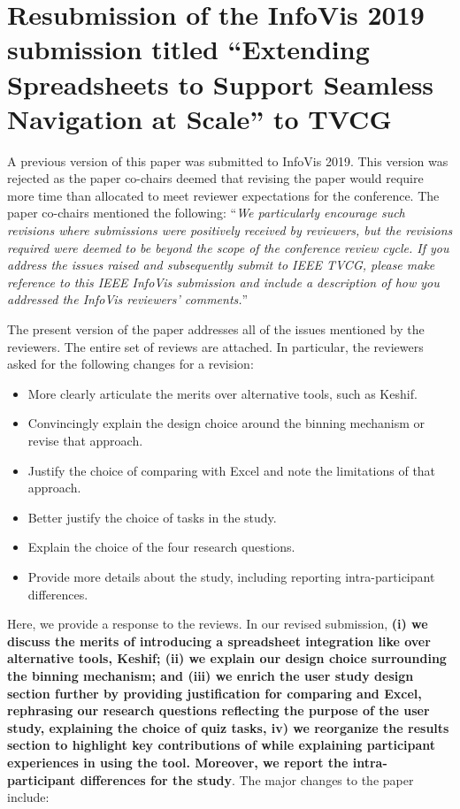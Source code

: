 \section*{Resubmission of the InfoVis 2019 submission titled ``Extending Spreadsheets to Support Seamless
Navigation at Scale'' to TVCG}

A previous version of this paper was submitted to InfoVis 2019. This version was rejected as the paper co-chairs deemed that revising the paper would require more time than allocated to meet reviewer expectations for the conference. The paper co-chairs mentioned the following: ``\textit{We particularly encourage such revisions where submissions were positively received by reviewers, but the revisions required were deemed to be beyond the scope of the conference review cycle. If you address the issues raised and subsequently submit to IEEE TVCG, please make reference to this IEEE InfoVis submission and include a description of how you addressed the InfoVis reviewers' comments.}'' 

The present version of the paper addresses all of the issues mentioned by the reviewers. The entire set of reviews are attached. In particular, the reviewers asked for the following changes for a revision: \begin{itemize}
    \item More clearly articulate the merits over alternative tools, such as Keshif. 
     \item Convincingly explain the design choice around the binning mechanism or revise
    that approach.
    \item Justify the choice of comparing with Excel and note the limitations of that
    approach.
     \item Better justify the choice of tasks in the study. 
     \item Explain the choice of the four research questions.
     \item Provide more details about the study, including reporting intra-participant
    differences.
\end{itemize} 

Here, we provide a response to the reviews. In our revised submission,
\textbf{(i) we discuss the merits of introducing a spreadsheet integration like \noah over alternative tools, \eg Keshif;
(ii) we explain our design choice surrounding the binning mechanism;
and 
(iii) we enrich the user study design section further by providing justification for comparing \noah and Excel, rephrasing our research questions reflecting the purpose of the user study, explaining the choice of quiz tasks,
iv) we reorganize the results section to  highlight key contributions of \noah while explaining participant experiences in using the tool. Moreover, we report the  intra-participant differences for the study}. 
The major changes to the paper include:

